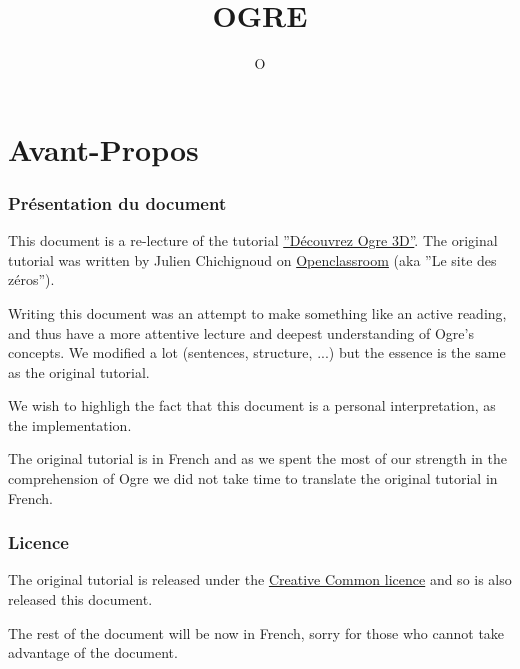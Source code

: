 \documentclass[10pt,a4paper]{report}
\title{OGRE}
\author{O}
\begin{document}
\part*{Avant-Propos}
\section*{Pr\'esentation du document}
This document is a re-lecture of the tutorial \href{http://fr.openclassrooms.com/informatique/cours/decouvrez-ogre-3d}{''D\'ecouvrez Ogre 3D''}. The original tutorial was written by Julien Chichignoud on \href{fr.openclassrooms.com}{Openclassroom} (aka ''Le site des z\'eros'').\newline

Writing this document was an attempt to make something like an active reading, and thus have a more attentive lecture and deepest understanding of Ogre's concepts. We modified a lot (sentences, structure, ...) but the essence is the same as the original tutorial.\newline

We wish to highligh the fact that this document is a personal interpretation, as the implementation.\newline

The original tutorial is in French and as we spent the most of our strength in the comprehension of Ogre we did not take time to translate the original tutorial in French.\newline


\section*{Licence}
The original tutorial is released under the 
\href{http://creativecommons.org/licenses/by-nc-sa/2.0/}{Creative Common licence} and so is also released this document.\newline

The rest of the document will be now in French, sorry for those who cannot take advantage of the document.
\end{document}
